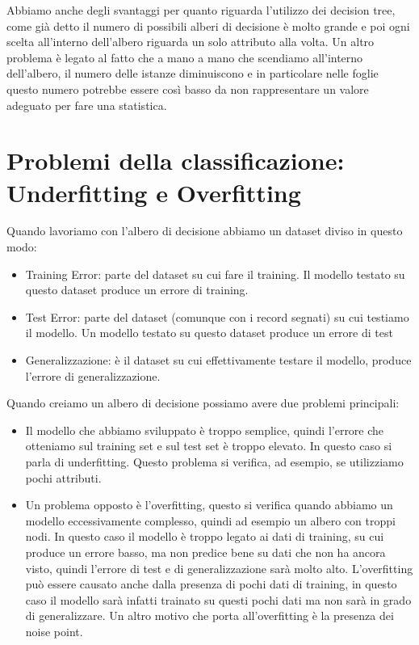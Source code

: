 \documentclass[14pt]{extreport}
\begin{document}
Abbiamo anche degli svantaggi per quanto riguarda l'utilizzo dei decision tree, come già detto il numero di possibili alberi di decisione è molto grande e poi ogni scelta all'interno dell'albero riguarda un solo attributo alla volta.
Un altro problema è legato al fatto che a mano a mano che scendiamo all'interno dell'albero, il numero delle istanze diminuiscono e in particolare nelle foglie questo numero potrebbe essere così basso da non rappresentare un valore adeguato per fare una statistica.

\section{Problemi della classificazione: Underfitting e Overfitting}

Quando lavoriamo con l'albero di decisione abbiamo un dataset diviso in questo modo:
\begin{itemize}
    \item Training Error: parte del dataset su cui fare il training. Il modello testato su questo dataset produce un errore di training.
    \item Test Error: parte del dataset (comunque con i record segnati) su cui testiamo il modello. Un modello testato su questo dataset produce un errore di test
    \item Generalizzazione: è il dataset su cui effettivamente testare il modello, produce l'errore di generalizzazione.
\end{itemize}

Quando creiamo un albero di decisione possiamo avere due problemi principali:

\begin{itemize}
    \item Il modello che abbiamo sviluppato è troppo semplice, quindi l'errore che otteniamo sul training set e sul test set è troppo elevato. In questo caso si parla di underfitting.
    Questo problema si verifica, ad esempio, se utilizziamo pochi attributi.
    \item Un problema opposto è l'overfitting, questo si verifica quando abbiamo un modello eccessivamente complesso, quindi ad esempio un albero con troppi nodi. In questo caso il modello è troppo legato ai dati di training, su cui produce un errore basso, ma non predice bene su dati che non ha ancora visto, quindi l'errore di test e di generalizzazione sarà molto alto.
    L'overfitting può essere causato anche dalla presenza di pochi dati di training, in questo caso il modello sarà infatti trainato su questi pochi dati ma non sarà in grado di generalizzare. Un altro motivo che porta all'overfitting è la presenza dei noise point.
\end{itemize}
\end{document}
